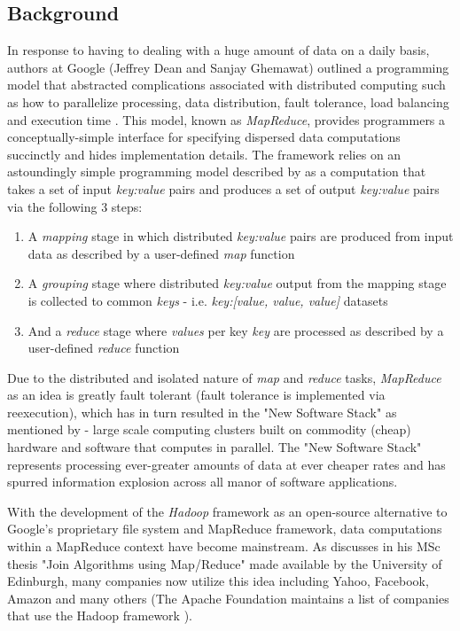 \subsection{Background}

In response to having to dealing with a huge amount of data on a daily basis, authors at Google (Jeffrey Dean and Sanjay Ghemawat) outlined a programming model that abstracted complications associated with distributed computing such as how to parallelize processing, data distribution, fault tolerance, load balancing and execution time \cite{Dean:2008}. This model, known as \textit{MapReduce}, provides programmers a conceptually-simple interface for specifying dispersed data computations succinctly and hides implementation details. The framework relies on an astoundingly simple programming model described by \cite{Dean:2008} as a computation that takes a set of input \textit{key:value} pairs and produces a set of output \textit{key:value} pairs via the following 3 steps:

\begin{enumerate}
    \item A \textit{mapping} stage in which distributed \textit{key:value} pairs are produced from input data as described by a user-defined \textit{map} function
    \item A \textit{grouping} stage where distributed \textit{key:value} output from the mapping stage is collected to common \textit{keys} - i.e. \textit{key:[value, value, value]} datasets
    \item And a \textit{reduce} stage where \textit{values} per key \textit{key} are processed as described by a user-defined \textit{reduce} function
\end{enumerate}

Due to the distributed and isolated nature of \textit{map} and \textit{reduce} tasks, \textit{MapReduce} as an idea is greatly fault tolerant (fault tolerance is implemented via reexecution), which has in turn resulted in the "New Software Stack" as mentioned by \cite{mining2011} - large scale computing clusters built on commodity (cheap) hardware and software that computes in parallel. The "New Software Stack" represents processing ever-greater amounts of data at ever cheaper rates and has spurred information explosion across all manor of software applications.

With the development of the \textit{Hadoop} framework as an open-source alternative to Google's proprietary file system and MapReduce framework, data computations within a MapReduce context have become mainstream. As \cite{chandar2010} discusses in his MSc thesis "Join Algorithms using Map/Reduce" made available by the University of Edinburgh, many companies now utilize this idea including Yahoo, Facebook, Amazon and many others (The Apache Foundation maintains a list of companies that use the Hadoop framework \cite{hadoopPower:2017}).


